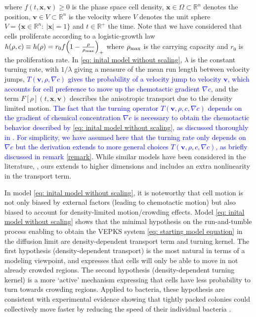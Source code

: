 \documentclass{article}
\begin{document}
{\begin{equation}
\end{equation} where $f(t,\mathbf{x},\mathbf{v}) \geq 0$ is the phase space cell density,  $\mathbf{x}\in \Omega \subset \mathbb{R}^n$ denotes the position, $\mathbf{v} \in V \subset \mathbb{R}^n$ is the velocity where $V$ denotes the unit sphere  $V=\{\mathbf{x}\in\mathbb{R}^n:\ |\mathbf{x}|=1 \}$ and $t \in \mathbb{R}^+$ the time. {Note that we have considered that cells proliferate according to a logistic-growth law $h(\rho,c) \equiv h(\rho) =  r_0f\Bigl(1-\frac{\rho}{\rho_{\textnormal{max}}} \Bigr)_+$ where $\rho_{\textnormal{max}}$ is the carrying capacity and $r_0$ is the proliferation rate.} In \eqref{eq: inital model without scaling}, $\lambda$ is the constant turning rate, with $1/\lambda$ giving a measure of the mean run length between velocity jumps, \textcolor{blue}{$T(\mathbf{v},\rho,\nabla c)$ gives the probability of a velocity jump to velocity $\mathbf{v}$, which accounts for cell preference to move up the chemotactic gradient $\nabla c$}, and the term $F[\rho](t,\mathbf{x},\mathbf{v})$ describes the anisotropic transport due to the density limited motion. \textcolor{blue}{The fact that the turning operator $T(\mathbf{v},\rho,c,\nabla c)$ depends on the gradient of chemical concentration $\nabla c$ is necessary to obtain the chemotactic behavior described by \eqref{eq: inital model without scaling}, as discussed thoroughly in \cite{othmer2002diffusion}. For simplicity, we have assumed here that the turning rate only depends on $\nabla c$ but the derivation extends to more general choices $T(\mathbf{v},\rho,c,\nabla c)$, as briefly discussed in remark \ref{remark}}. While similar models have been considered in the literature,  \cite{othmer2002diffusion,othmer2000diffusion}, ours extends to higher dimensions and includes an extra nonlinearity in the transport term.

In model \eqref{eq: inital model without scaling}, it is noteworthy that cell motion is not only biased by external factors (leading to chemotactic motion) but also biased to account for density-limited motion/crowding effects. Model \eqref{eq: inital model without scaling} shows that the minimal hypothesis on the run-and-tumble process enabling to obtain the VEPKS system \eqref{eq: starting model equation} in the diffusion limit are density-dependent transport term and turning kernel. The first hypothesis (density-dependent transport) is the most natural in terms of a modeling viewpoint, and expresses that cells will only be able to move in not already crowded regions. The second hypothesis (density-dependent turning kernel) is a more `active' mechanism expressing that cells have less probability to turn towards crowding regions. Applied to bacteria, these hypothesis are consistent with experimental evidence showing that tightly packed colonies could collectively move faster by reducing the speed of their individual bacteria \cite{Meacock2021}.} 
\end{document}

